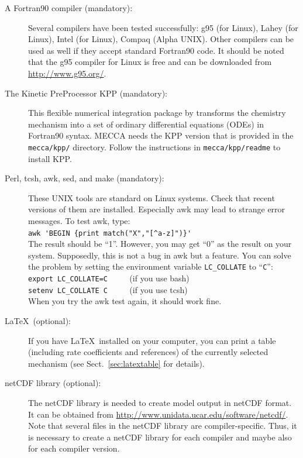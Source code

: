 \documentclass[twoside]{article}
\begin{document}
\begin{description}
\item[A Fortran90 compiler (mandatory):] Several compilers have been
  tested successfully: g95 (for Linux), Lahey (for Linux), Intel (for
  Linux), Compaq (Alpha UNIX). Other compilers can be used as well if
  they accept standard Fortran90 code. It should be noted that the g95
  compiler for Linux is free and can be downloaded from
  \url{http://www.g95.org/}.
\item[The Kinetic PreProcessor KPP (mandatory):] This flexible numerical
  integration package by \citet{1665} transforms the chemistry mechanism
  into a set of ordinary differential equations (ODEs) in Fortran90
  syntax. MECCA needs the KPP version that is provided in the
  \verb|mecca/kpp/| directory. Follow the instructions in
  \verb|mecca/kpp/readme| to install KPP.
\item[Perl, tcsh, awk, sed, and make (mandatory):] These UNIX tools are
  standard on Linux systems. Check that recent versions of them are
  installed. Especially awk may lead to strange error messages.
  To test awk, type:\\
  \verb|awk 'BEGIN {print match("X","[^a-z]")}'|\\
  The result should be ``1''. However, you may get ``0'' as the result
  on your system. Supposedly, this is not a bug in awk but a feature.
  You can solve the problem by setting the environment variable
  \verb|LC_COLLATE| to ``\verb|C|'':\\
  \verb|export LC_COLLATE=C| $\qquad$ (if you use bash)\\
  \verb|setenv LC_COLLATE C| $\qquad$ (if you use tcsh)\\
  When you try the awk test again, it should work fine.
\item[La\TeX\ (optional):] If you have La\TeX\ installed on your
  computer, you can print a table (including rate coefficients and
  references) of the currently selected mechanism (see
  Sect.~\ref{sec:latextable} for details).
\item[netCDF library (optional):] The netCDF library is needed to create
  model output in netCDF format. It can be obtained from
  \url{http://www.unidata.ucar.edu/software/netcdf/}. Note that several
  files in the netCDF library are compiler-specific. Thus, it is
  necessary to create a netCDF library for each compiler and maybe also
  for each compiler version.


\end{description}
\end{document}
